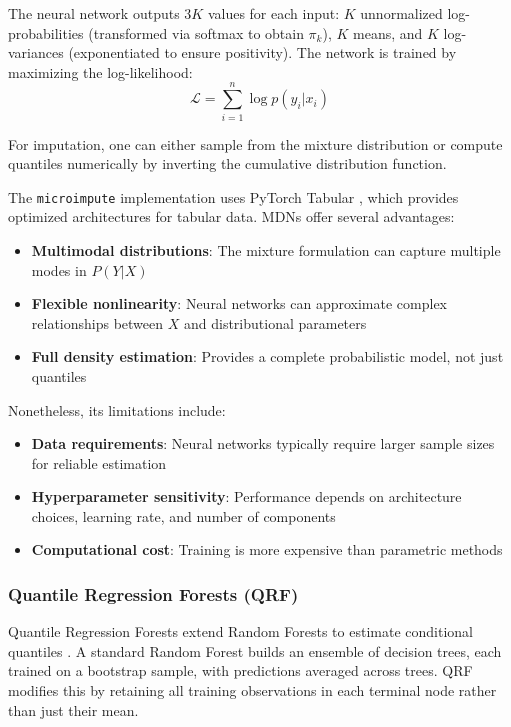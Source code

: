 The neural network outputs $3K$ values for each input: $K$ unnormalized log-probabilities (transformed via softmax to obtain $\pi_k$), $K$ means, and $K$ log-variances (exponentiated to ensure positivity). The network is trained by maximizing the log-likelihood:
\begin{equation}
    \mathcal{L} = \sum_{i=1}^{n} \log p(y_i | x_i)
\end{equation}

For imputation, one can either sample from the mixture distribution or compute quantiles numerically by inverting the cumulative distribution function.

The \texttt{microimpute} implementation uses PyTorch Tabular \citep{pytorch_tabular}, which provides optimized architectures for tabular data. MDNs offer several advantages:
\begin{itemize}
    \item \textbf{Multimodal distributions}: The mixture formulation can capture multiple modes in $P(Y|X)$
    \item \textbf{Flexible nonlinearity}: Neural networks can approximate complex relationships between $X$ and distributional parameters
    \item \textbf{Full density estimation}: Provides a complete probabilistic model, not just quantiles
\end{itemize}

Nonetheless, its limitations include:
\begin{itemize}
    \item \textbf{Data requirements}: Neural networks typically require larger sample sizes for reliable estimation
    \item \textbf{Hyperparameter sensitivity}: Performance depends on architecture choices, learning rate, and number of components
    \item \textbf{Computational cost}: Training is more expensive than parametric methods
\end{itemize}

\subsubsection{Quantile Regression Forests (QRF)}\label{sec:qrf_background}

Quantile Regression Forests extend Random Forests to estimate conditional quantiles \citep{meinshausen2006quantile}. A standard Random Forest builds an ensemble of decision trees, each trained on a bootstrap sample, with predictions averaged across trees. QRF modifies this by retaining all training observations in each terminal node rather than just their mean.

